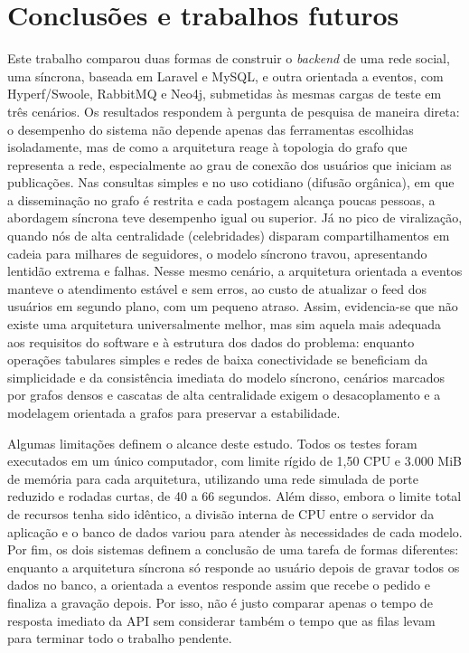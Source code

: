 \estrutura\section{\esp Conclusões e trabalhos futuros}

Este trabalho comparou duas formas de construir o \textit{backend} de uma rede social, uma síncrona, baseada em Laravel e MySQL, e outra orientada a eventos, com Hyperf/Swoole, RabbitMQ e Neo4j, submetidas às mesmas cargas de teste em três cenários. Os resultados respondem à pergunta de pesquisa de maneira direta: o desempenho do sistema não depende apenas das ferramentas escolhidas isoladamente, mas de como a arquitetura reage à topologia do grafo que representa a rede, especialmente ao grau de conexão dos usuários que iniciam as publicações. Nas consultas simples e no uso cotidiano (difusão orgânica), em que a disseminação no grafo é restrita e cada postagem alcança poucas pessoas, a abordagem síncrona teve desempenho igual ou superior. Já no pico de viralização, quando nós de alta centralidade (celebridades) disparam compartilhamentos em cadeia para milhares de seguidores, o modelo síncrono travou, apresentando lentidão extrema e falhas. Nesse mesmo cenário, a arquitetura orientada a eventos manteve o atendimento estável e sem erros, ao custo de atualizar o feed dos usuários em segundo plano, com um pequeno atraso. Assim, evidencia-se que não existe uma arquitetura universalmente melhor, mas sim aquela mais adequada aos requisitos do software e à estrutura dos dados do problema: enquanto operações tabulares simples e redes de baixa conectividade se beneficiam da simplicidade e da consistência imediata do modelo síncrono, cenários marcados por grafos densos e cascatas de alta centralidade exigem o desacoplamento e a modelagem orientada a grafos para preservar a estabilidade.

Algumas limitações definem o alcance deste estudo. Todos os testes foram executados em um único computador, com limite rígido de 1,50 CPU e 3.000 MiB de memória para cada arquitetura, utilizando uma rede simulada de porte reduzido e rodadas curtas, de 40 a 66 segundos. Além disso, embora o limite total de recursos tenha sido idêntico, a divisão interna de CPU entre o servidor da aplicação e o banco de dados variou para atender às necessidades de cada modelo. Por fim, os dois sistemas definem a conclusão de uma tarefa de formas diferentes: enquanto a arquitetura síncrona só responde ao usuário depois de gravar todos os dados no banco, a orientada a eventos responde assim que recebe o pedido e finaliza a gravação depois. Por isso, não é justo comparar apenas o tempo de resposta imediato da API sem considerar também o tempo que as filas levam para terminar todo o trabalho pendente.

